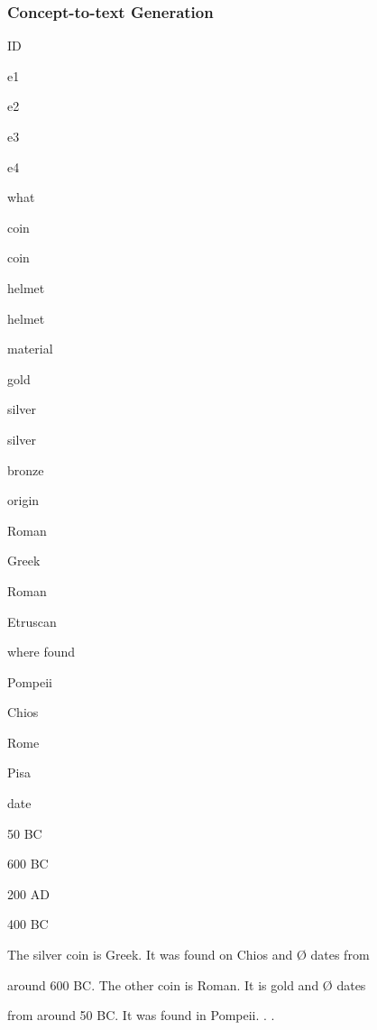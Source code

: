 \documentclass[compress,color=usenames]{beamer}
\begin{document}
\begin{frame}
\frametitle{Concept-to-text Generation}

ID

e1

e2

e3

e4

what

coin

coin

helmet

helmet

material

gold

silver

silver

bronze

origin

Roman

Greek

Roman

Etruscan

where found

Pompeii

Chios

Rome

Pisa

date

50 BC

600 BC

200 AD

400 BC

The silver coin is Greek. It was found on Chios and {\O} dates from

around 600 BC. The other coin is Roman. It is gold and {\O} dates

from around 50 BC. It was found in Pompeii. . .

\end{frame}
\end{document}
